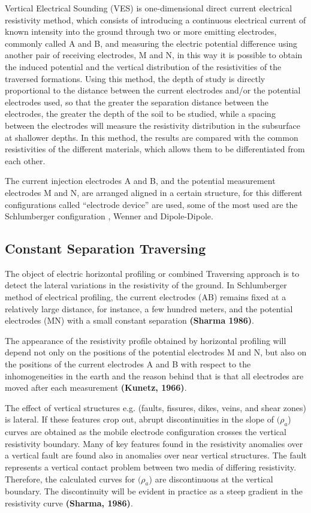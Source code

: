 \documentclass[12pt,a4paper]{report}
\begin{document}
Vertical Electrical Sounding (VES) is one-dimensional direct current electrical resistivity method, which consists of introducing a continuous electrical current of known intensity into the ground through two or more emitting electrodes, commonly called A and B, and measuring the electric potential difference using another pair of receiving electrodes, M and N, in this way it is possible to obtain the induced potential and the vertical distribution of the resistivities of the traversed formations. Using this method, the depth of study is directly proportional to the distance between the current electrodes and/or the potential electrodes used, so that the greater the separation distance between the electrodes, the greater the depth of the soil to be studied, while a spacing between the electrodes will measure the resistivity distribution in the subsurface at shallower depths. In this method, the results are compared with the common resistivities of the different materials, which allows them to be differentiated from each other.

The current injection electrodes A and B, and the potential measurement electrodes M and N, are arranged aligned in a certain structure, for this different configurations called “electrode device” are used, some of the most used are the Schlumberger configuration , Wenner and Dipole-Dipole.

\subsection{Constant Separation Traversing}
The object of electric horizontal profiling or combined Traversing
approach is to detect the lateral variations in the resistivity of the ground. In
Schlumberger method of electrical profiling, the current electrodes (AB)
remains fixed at a relatively large distance, for instance, a few hundred meters,
and the potential electrodes (MN) with a small constant separation \textbf{(Sharma
1986)}.

The appearance of the resistivity profile obtained by horizontal profiling will
depend not only on the positions of the potential electrodes M and N, but also
on the positions of the current electrodes A and B with respect to the
inhomogeneities in the earth and the reason behind that is that all electrodes are
moved after each measurement \textbf{(Kunetz, 1966)}.

The effect of vertical structures e.g. (faults, fissures, dikes, veins, and shear
zones) is lateral. If these features crop out, abrupt discontinuities in the slope of
\((\rho_a\)) curves are obtained as the mobile electrode configuration crosses the
vertical resistivity boundary. Many of key features found in the resistivity
anomalies over a vertical fault are found also in anomalies over near vertical
structures. The fault represents a vertical contact problem between two media of
differing resistivity. Therefore, the calculated curves for \((\rho_a\)) are discontinuous
at the vertical boundary. The discontinuity will be evident in practice as a steep
gradient in the resistivity curve \textbf{(Sharma, 1986)}.
\end{document}
